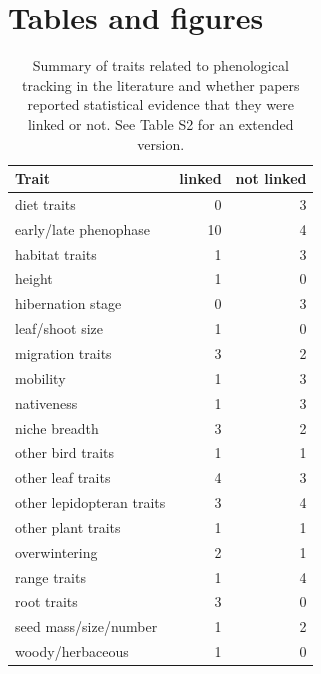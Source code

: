 \documentclass[11pt,letter]{article}
\begin{document}
\clearpage
\section{Tables and figures}

\begin{table}[ht]
\centering
\caption{Summary of traits related to phenological tracking in the literature and whether papers reported statistical evidence that they were linked or not. See Table S2 for an extended version.} 
\label{tab:meta1}
\begingroup\footnotesize
\begin{tabular}{lrr}
  \hline
Trait & linked & not linked \\ 
  \hline
diet traits &   0 &   3 \\ 
  early/late phenophase &  10 &   4 \\ 
  habitat traits &   1 &   3 \\ 
  height &   1 &   0 \\ 
  hibernation stage &   0 &   3 \\ 
  leaf/shoot size &   1 &   0 \\ 
  migration traits &   3 &   2 \\ 
  mobility &   1 &   3 \\ 
  nativeness &   1 &   3 \\ 
  niche breadth &   3 &   2 \\ 
  other bird traits &   1 &   1 \\ 
  other leaf traits &   4 &   3 \\ 
  other lepidopteran traits &   3 &   4 \\ 
  other plant traits &   1 &   1 \\ 
  overwintering &   2 &   1 \\ 
  range traits &   1 &   4 \\ 
  root traits &   3 &   0 \\ 
  seed mass/size/number &   1 &   2 \\ 
  woody/herbaceous &   1 &   0 \\ 
   \hline
\end{tabular}
\endgroup
\end{table}%
\end{document}
